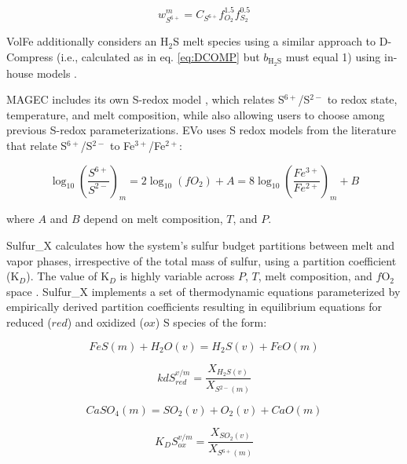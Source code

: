 \documentclass[draft, english]{volcanica-template}
\begin{document}
\begin{equation}
    w^m_{S^{6+}} = C_{S^{6+}}f_{O_2}^{1.5}f_{S_2}^{0.5}
\end{equation}

\noindent VolFe additionally considers an H$_2$S melt species using a similar approach to D-Compress (i.e., calculated as in eq. \ref{eq:DCOMP} but $b_{\mathrm{H_2S}}$ must equal 1) using in-house models \parencite{hughes2024}. 

MAGEC includes its own S-redox model \parencite{Sun2024}, which relates S$^{6+}$/S$^{2-}$ to redox state, temperature, and melt composition, while also allowing users to choose among previous S-redox parameterizations. EVo uses S redox models from the literature \parencite[e.g.,][]{Nash2019,jugo2010,Oneill2022,boulliung2023sulfur} that relate S$^{6+}$/S$^{2-}$ to Fe$^{3+}$/Fe$^{2+}$: 

\begin{equation}
    \log_{10}\left( \frac{S^{6+}}{S^{2-}} \right)_m = 2\log_{10}(fO_2) + A = 8\log_{10}\left( \frac{Fe^{3+}}{Fe^{2+}} \right)_m + B
    \label{eq:FeSredox}
\end{equation}

\noindent where $A$ and $B$ depend on melt composition, $T$, and $P$. 

Sulfur\_X calculates how the system's sulfur budget partitions between melt and vapor phases, irrespective of the total mass of sulfur, using a partition coefficient (K$_D$). The value of K$_D$ is highly variable across $P$, $T$, melt composition, and $f$O$_2$ space \parencite[e.g.,][]{webster2011distribution}. Sulfur\_X implements a set of thermodynamic equations parameterized by empirically derived partition coefficients resulting in equilibrium equations for reduced ($red$) and oxidized ($ox$) S species of the form: 

\begin{equation}
    FeS(m) + H_2O(v) = H_2S(v) + FeO(m)
    \label{eq:SulfurX_red}
\end{equation}

\begin{equation}
    kdS^{v/m}_{red} = \frac{X_{H{_2}S(v)}}{X_{S{^{2-}(m)}}}
    \label{eq:SulfurX_redKd}
\end{equation}

\begin{equation}
    CaSO_4(m) = SO_2(v) + O_2(v) + CaO(m)
    \label{eq:SulfurX_ox}
\end{equation}

\begin{equation}
    K_DS^{v/m}_{ox} = \frac{X_{SO{_2}(v)}}{X_{S{^{6+}(m)}}}
    \label{eq:SulfurX_oxKd}
\end{equation}
\end{document}
